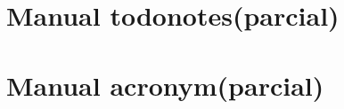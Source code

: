 
\begin{anexosenv}
\anexos
\partanexos

\chapter{Manual todonotes(parcial)}
\label{manual-todonotes}
%

%
%

\chapter{Manual acronym(parcial)}
%



%


\end{anexosenv}
